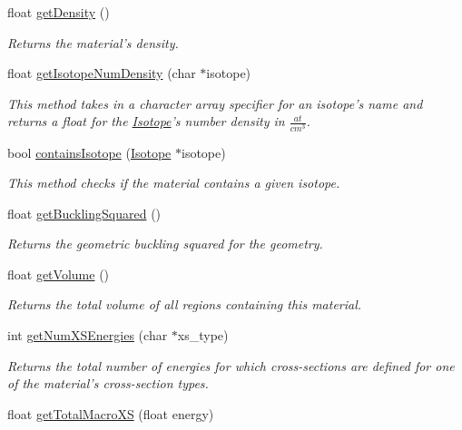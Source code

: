 \begin{DoxyCompactItemize}
float \hyperlink{classMaterial_a40740dabb21cc8ba24b168935e10b06f}{get\-Density} ()
\begin{DoxyCompactList}\small\item\em Returns the material's density. \end{DoxyCompactList}\item 
float \hyperlink{classMaterial_ad1e6d2015b73498a21f83783d8cf8266}{get\-Isotope\-Num\-Density} (char $\ast$isotope)
\begin{DoxyCompactList}\small\item\em This method takes in a character array specifier for an isotope's name and returns a float for the \hyperlink{classIsotope}{Isotope}'s number density in $ \frac{at}{cm^3} $. \end{DoxyCompactList}\item 
bool \hyperlink{classMaterial_a00b943e8ec54fc37f9a7d5ce0405234d}{contains\-Isotope} (\hyperlink{classIsotope}{Isotope} $\ast$isotope)
\begin{DoxyCompactList}\small\item\em This method checks if the material contains a given isotope. \end{DoxyCompactList}\item 
float \hyperlink{classMaterial_a017adfe40f5395a14cc92bb22e07740c}{get\-Buckling\-Squared} ()
\begin{DoxyCompactList}\small\item\em Returns the geometric buckling squared for the geometry. \end{DoxyCompactList}\item 
float \hyperlink{classMaterial_ab88c88c9d5f7638d2c4029c3cf589aae}{get\-Volume} ()
\begin{DoxyCompactList}\small\item\em Returns the total volume of all regions containing this material. \end{DoxyCompactList}\item 
int \hyperlink{classMaterial_a292d37ee63031928c8f2bcdc5f7d90cb}{get\-Num\-X\-S\-Energies} (char $\ast$xs\-\_\-type)
\begin{DoxyCompactList}\small\item\em Returns the total number of energies for which cross-\/sections are defined for one of the material's cross-\/section types. \end{DoxyCompactList}\item 
float \hyperlink{classMaterial_a019bd7d8dc5cb655a84747bb6e3016dc}{get\-Total\-Macro\-X\-S} (float energy)

\end{DoxyCompactItemize}
